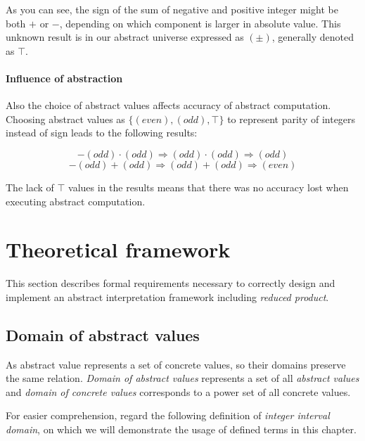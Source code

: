 \documentclass[12pt,oneside]{fithesis2}
\theoremstyle{definition}
\begin{document}
As you can see, the sign of the sum of negative and positive integer might be both $+$ or $-$, depending on which component is larger in absolute value. This unknown result is in our abstract universe expressed as $(\pm)$, generally denoted as $\top$.

\paragraph{Influence of abstraction}
Also the choice of abstract values affects accuracy of abstract computation. Choosing abstract values as $\{(even), (odd), \top\}$ to represent parity of integers instead of sign leads to the following results:

\[ -(odd) \cdot (odd) \Rightarrow (odd) \cdot (odd) \Rightarrow (odd) \]
\[ -(odd) + (odd) \Rightarrow (odd) + (odd) \Rightarrow (even) \]

The lack of $\top$ values in the results means that there was no accuracy lost when executing abstract computation.

\section{Theoretical framework}

This section describes formal requirements necessary to correctly design and implement an abstract interpretation framework including \textit{reduced product}.

\subsection{Domain of abstract values}

As abstract value represents a set of concrete values, so their domains preserve the same relation. \textit{Domain of abstract values} represents a set of all \textit{abstract values} and \textit{domain of concrete values} corresponds to a power set of all concrete values.

For easier comprehension, regard the following definition of \textit{integer interval domain}\cite{mine-WING12}, on which we will demonstrate the usage of defined terms in this chapter.
\end{document}
